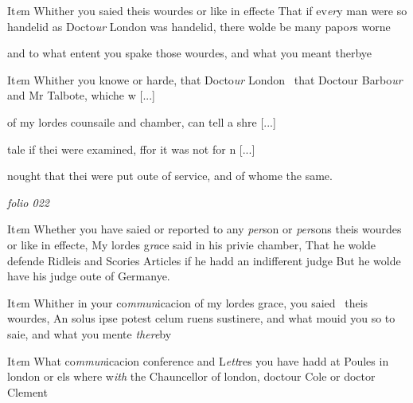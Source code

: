 \documentclass[12pt, a4paper]{book}
\begin{document}
		\ifthenelse{\isodd{\thepage}}
		{\reversemarginpar}
		{\normalmarginpar}
		 It\textit{e}m Whither you saied theis wourdes or like in effecte
That if ev\textit{er}y man were so handelid as Docto\textit{ur} London
 was handelid, there wolde be many papo\textit{r}s worne
			
 and to what entent you spake those wourdes, and what
 you meant therbye
            		
				\marginpar[\vspace{0.5cm}{\textcolor{Gray}{n}}]{}
			
		\ifthenelse{\isodd{\thepage}}
		{\reversemarginpar}
		{\normalmarginpar}
		It\textit{e}m Whither you knowe or harde, that Docto\textit{ur} London 
            			that Doctour Barbo\textit{ur} and Mr Talbote, whiche w
				[...]
			
            			of my lordes counsaile and chamber, can tell a shre
				[...]
			
            			tale if thei were examined, ffor it was not for n
				[...]
			
 nought
			 that thei were put oute of service, and of whome
 the same.
 

\dotfill
					

\textit{folio 022}



		\ifthenelse{\isodd{\thepage}}
		{\reversemarginpar}
		{\normalmarginpar}
		It\textit{e}m Whether you have saied or reported to any \textit{per}son
	or \textit{per}sons theis wourdes or like in effecte, My lordes g\textit{ra}ce
 said in his privie chamber, That he wolde defende Ridleis
 and Scories Articles if he hadd an indifferent judge
 But he wolde have his judge oute of Germanye.

		\ifthenelse{\isodd{\thepage}}
		{\reversemarginpar}
		{\normalmarginpar}
		It\textit{e}m Whither in your co\textit{mmun}icacion of my lordes grace, you saied 
 theis wourdes, An solus ipse potest celum ruens sustinere,
 and what mouid you so to saie, and what you mente \textit{there}by
 	
				\marginpar[\vspace{0.5cm}{\textcolor{Gray}{n}}]{}
			
		\ifthenelse{\isodd{\thepage}}
		{\reversemarginpar}
		{\normalmarginpar}
		 It\textit{e}m What co\textit{mmun}icacion conference and L\textit{ett}res you have hadd at
 		Poules in london or els where w\textit{ith} the Chauncellor of london, doctour Cole or doctor Clement
			
\end{document}
